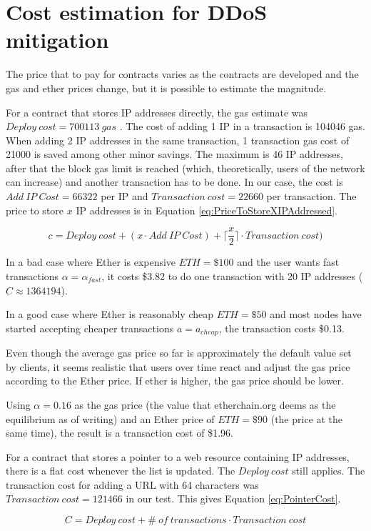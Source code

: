 \section{Cost estimation for DDoS mitigation}

The price that to pay for contracts varies as the contracts are developed and the gas and ether prices change, but it is possible to estimate the magnitude.

For a contract that stores IP addresses directly, the gas estimate was $ Deploy\ cost = 700113\ gas$ . The cost of adding 1 IP in a transaction is 104046 gas. When adding 2 IP addresses in the same transaction, 1 transaction gas cost of 21000 is saved among other minor savings.  The maximum is 46 IP addresses, after that the block gas limit is reached (which, theoretically, users of the network can increase) and another transaction has to be done. In our case, the cost is $ Add \ IP\ Cost = 66322 $ per IP and $ Transaction\ cost = 22660 $ per transaction. The price to store $ x $ IP addresses is in Equation \ref{eq:PriceToStoreXIPAddressed}.

\begin{equation}
c = Deploy\ cost + (x \cdot Add\ IP\ Cost) + \lceil\frac{x}{2}\rceil \cdot Transaction\ cost)
\label{eq:PriceToStoreXIPAddressed}
\end{equation}

In a bad case where Ether is expensive $ ETH = \$100 $ and the user wants fast transactions $ \alpha = \alpha_{fast} $, it costs \$3.82 to do one transaction with 20 IP addresses ($ C \approx 1364194 $).

In a good case where Ether is reasonably cheap $ ETH = \$50 $ and most nodes have started accepting cheaper transactions $ a = a_{cheap} $, the transaction costs \$0.13.

Even though the average gas price so far is approximately the default value set by clients, it seems realistic that users over time react and adjust the gas price according to the Ether price. If ether is higher, the gas price should be lower.

Using $ \alpha = 0.16 $ as the gas price (the value that etherchain.org deems as the equilibrium as of writing) and an Ether price of $ ETH = \$90 $ (the price at the same time), the result is a transaction cost of \$1.96.

For a contract that stores a pointer to a web resource containing IP addresses, there is a flat cost whenever the list is updated. The $Deploy\ cost$ still applies. The transaction cost for adding a URL with 64 characters was $ Transaction\ cost = 121466 $ in our test. This gives Equation \ref{eq:PointerCost}.

\begin{equation}
    C = Deploy\ cost + \#\ of\ transactions \cdot Transaction\ cost
    \label{eq:PointerCost}
\end{equation}
